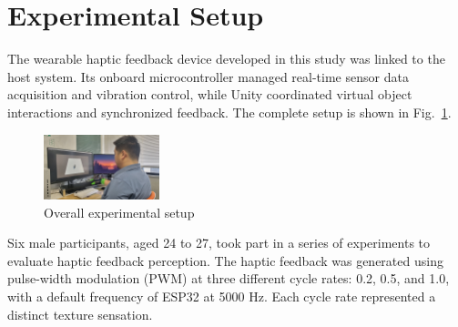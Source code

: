 \documentclass[a4paper,twocolumn]{article}
\begin{document}

\section{Experimental Setup}
The wearable haptic feedback device developed in this study was linked to the host system. Its onboard microcontroller managed real-time sensor data acquisition and vibration control, while Unity coordinated virtual object interactions and synchronized feedback. The complete setup is shown in Fig.~\ref{fig:experiment}.
\begin{figure}[H]\centering
	\includegraphics[width=0.3\textwidth]{Fig/experiment.png}%
	\caption{Overall experimental setup}\label{fig:experiment}%
\end{figure}

Six male participants, aged 24 to 27, took part in a series of experiments to evaluate haptic feedback perception. The haptic feedback was generated using pulse-width modulation (PWM) at three different cycle rates: 0.2, 0.5, and 1.0, with a default frequency of ESP32 at 5000 Hz. Each cycle rate represented a distinct texture sensation.
\end{document}
